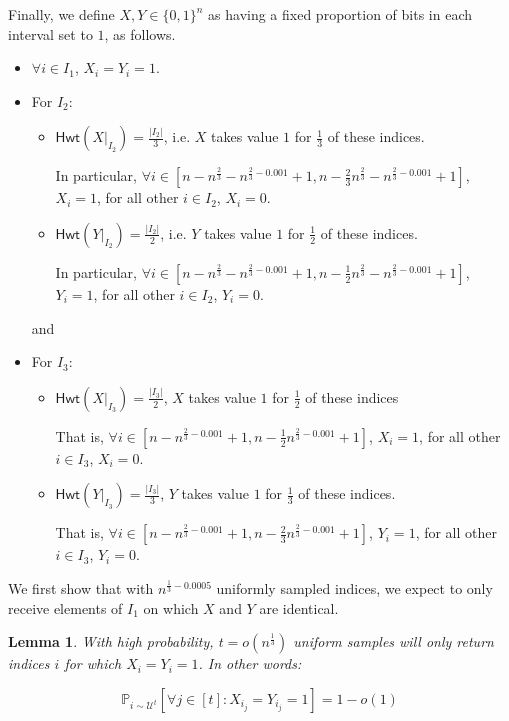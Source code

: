 \documentclass[11pt]{article}
\newtheorem{lemma}[theorem]{Lemma}
\newcommand{\Hamming}{\mathsf{Hwt}}
\begin{document}
Finally, we define $X, Y\in\{0,1\}^{n}$ as having a fixed proportion of bits in each interval set to $1$, as follows.
\begin{itemize}
    \item $\forall i\in I_{1}$, $X_{i}=Y_{i}=1$.
    \item For $I_{2}$:
    \begin{itemize}
        \item $\Hamming(X\vert_{I_{2}})=\frac{|I_{2}|}{3}$, i.e. $X$ takes value $1$ for $\frac{1}{3}$ of these indices. 
        
        In particular, $\forall i \in [n-n^{\frac{2}{3}}-n^{\frac{2}{3}-0.001}+1, n-\frac{2}{3}n^{\frac{2}{3}}-n^{\frac{2}{3}-0.001}+1]$, $X_{i}=1$, for all other $i\in I_{2}$, $X_{i}=0$.
        
        \item $\Hamming(Y\vert_{I_{2}})=\frac{|I_{2}|}{2}$, i.e. $Y$ takes value $1$ for $\frac{1}{2}$ of these indices. 
        
        In particular, $\forall i \in [n-n^{\frac{2}{3}}-n^{\frac{2}{3}-0.001}+1, n-\frac{1}{2}n^{\frac{2}{3}}-n^{\frac{2}{3}-0.001}+1]$, $Y_{i}=1$, for all other $i\in I_{2}$, $Y_{i}=0$.
    \end{itemize} and 
    \item For $I_{3}$:
    \begin{itemize}
        \item $\Hamming(X\vert_{I_{3}})=\frac{|I_{3}|}{2}$, $X$ takes value $1$ for $\frac{1}{2}$ of these indices
        
        That is, $\forall i \in [n-n^{\frac{2}{3}-0.001}+1, n-\frac{1}{2}n^{\frac{2}{3}-0.001}+1]$, $X_{i}=1$, for all other $i\in I_{3}$, $X_{i}=0$.
        
        \item $\Hamming(Y\vert_{I_{3}})=\frac{|I_{3}|}{3}$, $Y$ takes value $1$ for $\frac{1}{3}$ of these indices.
        
        That is, $\forall i \in [n-n^{\frac{2}{3}-0.001}+1, n-\frac{2}{3}n^{\frac{2}{3}-0.001}+1]$, $Y_{i}=1$, for all other $i\in I_{3}$, $Y_{i}=0$.
    \end{itemize} 
\end{itemize}

We first show that with $n^{\frac{1}{3}-0.0005}$ uniformly sampled indices, we expect to only receive elements of $I_{1}$ on which $X$ and $Y$ are identical. 
\begin{lemma}\label{usamps}
With high probability, $t = o(n^{\frac{1}{3}})$ uniform samples will only return indices $i$ for which $X_{i}=Y_{i}=1$. In other words:

\begin{equation}
    \mathbb{P}_{i\sim \mathcal{U}^{t}}\left [\forall j\in [t]:X_{i_{j}}=Y_{i_{j}}=1\right ]=1-o(1)
\end{equation}
\end{lemma}
\end{document}
